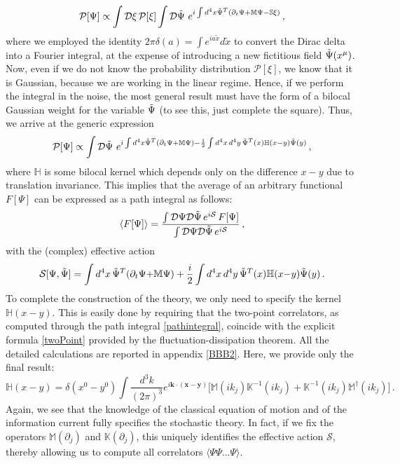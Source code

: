 \documentclass[a4paper, amsfonts, amssymb, amsmath, reprint, showkeys, nofootinbib, twoside,notitlepage,onecolumn]{revtex4-2}
\newcommand{\Ma}{{\mathbb{M}}}
\newcommand{\Sa}{{\mathbb{S}}}
\newcommand{\Ka}{{\mathbb{K}}}
\newcommand{\Ha}{{\mathbb{H}}}
\newcommand{\x}{{\textbf{x}}}
\newcommand{\y}{{\textbf{y}}}
\newcommand{\kb}{{\textbf{k}}}
\theoremstyle{definition}
\begin{document}
\begin{equation}
    \mathcal{P}[\Psi] \propto \int \mathcal{D}\xi \,   \mathcal{P}[\xi] \int \mathcal{D} \Tilde{\Psi} \, \, e^{i\int d^4x \Tilde{\Psi}^T(\partial_t \Psi {+}\Ma\Psi {-}\Sa\xi)} \, , 
\end{equation}
where we employed the identity $2\pi\delta(a)=\int e^{ia\tilde{x}} d\tilde{x}$ to convert the Dirac delta into a Fourier integral, at the expense of introducing a new fictitious field $\Tilde{\Psi}(x^\mu)$. Now, even if we do not know the probability distribution $\mathcal{P}[\xi]$, we know that it is Gaussian, because we are working in the linear regime. Hence, if we perform the integral in the noise, the most general result must have the form of a bilocal Gaussian weight for the variable $\Tilde{\Psi}$ (to see this, just complete the square). Thus, we arrive at the generic expression
\begin{equation}\label{probuzzuz}
    \mathcal{P}[\Psi] \propto \int \mathcal{D} \Tilde{\Psi} \, \, e^{i\int d^4x \Tilde{\Psi}^T(\partial_t \Psi {+}\Ma\Psi) -\frac{1}{2}\int d^4x \, d^4y \, \Tilde{\Psi}^T(x) \Ha(x-y)\Tilde{\Psi}(y)} \, ,
\end{equation}
where $\Ha$ is some bilocal kernel which depends only on the difference $x-y$ due to translation invariance. This implies that the average of an arbitrary functional $F[\Psi]$ can be expressed as a path integral as follows:
\begin{equation}\label{pathintegral}
    \langle F[\Psi] \rangle = \dfrac{\int \mathcal{D}\Psi \mathcal{D}\Tilde{\Psi} \, e^{i \mathcal{S}} \, F[\Psi]}{\int \mathcal{D}\Psi \mathcal{D}\Tilde{\Psi} \, e^{i\mathcal{S}} } \, ,
\end{equation}
with the (complex) effective action
\begin{equation}\label{effectiveaction}
    \mathcal{S}[\Psi,\Tilde{\Psi}]=\int d^4 x \, \Tilde{\Psi}^T(\partial_t \Psi {+}\Ma\Psi) +\frac{i}{2}\int d^4x \, d^4y \, \Tilde{\Psi}^T(x) \Ha(x{-}y)\Tilde{\Psi}(y) \, .
\end{equation}
To complete the construction of the theory, we only need to specify the kernel $\Ha(x-y)$. This is easily done by requiring that the two-point correlators, as computed through the path integral \eqref{pathintegral}, coincide with the explicit formula \eqref{twoPoint} provided by the fluctuation-dissipation theorem. All the detailed calculations are reported in appendix \ref{BBB2}. Here, we provide only the final result:
\begin{equation}\label{fbruf}
    \Ha(x{-}y)=\delta(x^0{-}y^0) \int \dfrac{d^3 k}{(2\pi)^3} e^{i \kb \cdot (\x-\y)} \big[ \Ma(ik_j)\Ka^{-1}(ik_j)+\Ka^{-1}(ik_j)\Ma^{\dagger}(ik_j)\big] \, .
\end{equation}
Again, we see that the knowledge of the classical equation of motion and of the information current fully specifies the stochastic theory. In fact, if we fix the operators $\Ma(\partial_j)$ and $\Ka(\partial_j)$, this uniquely identifies the effective action $\mathcal{S}$, thereby allowing us to compute all correlators $\langle \Psi \Psi ... \Psi\rangle$. 
\end{document}
